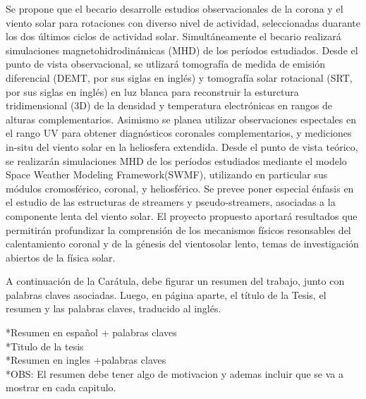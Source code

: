 \begin{center}
Se propone que el becario desarrolle estudios observacionales de la corona y el viento solar para rotaciones con diverso nivel de actividad, seleccionadas duarante los dos últimos ciclos de actividad solar. Simultáneamente el becario realizará simulaciones magnetohidrodinámicas (MHD) de los períodos estudiados. Desde el punto de vista observacional, se utlizará tomografía de medida de emisión diferencial (DEMT, por sus siglas en inglés) y tomografía solar rotacional (SRT, por sus siglas en inglés) en luz blanca para reconstruir la esturctura tridimensional (3D) de la densidad y temperatura electrónicas en rangos de alturas complementarios. Asimismo se planea utilizar observaciones espectales en el rango UV para obtener diagnósticos coronales complementarios, y mediciones in-situ del viento solar en la heliosfera extendida. Desde el punto de vista teórico, se realizarán simulaciones MHD de los períodos estudiados mediante el modelo Space Weather Modeling Framework(SWMF), utilizando en particular sus módulos cromosférico, coronal, y heliosférico. Se prevee poner especial énfasis en el estudio de las estructuras de streamers y pseudo-streamers, asociadas a la componente lenta del viento solar. El proyecto propuesto aportará resultados que permitirán profundizar la comprensión de los mecanismos físicos resonsables del calentamiento coronal y de la génesis del vientosolar lento, temas de investigación abiertos de la física solar.


A continuación de la Carátula, debe figurar un resumen del trabajo, junto con palabras claves asociadas. Luego, en página aparte, el título de la Tesis, el resumen y las palabras claves, traducido al inglés.


*Resumen en español + palabras claves \\
*Titulo de la tesis\\
*Resumen en ingles +palabras claves\\
*OBS: El resumen debe tener algo de motivacion y ademas incluir que se va a mostrar en cada capitulo.\\


\end{center}

\newpage~
\newpage
{} 


